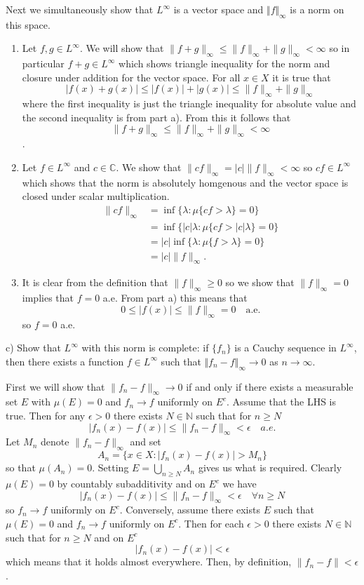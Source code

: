 \documentclass[12pt]{amsart} %
\def\N{\mathbb{N}}
\def\C{\mathbb{C}}
\begin{document}
Next we simultaneously show that $L^\infty$ is a vector space and $\Vert f \Vert_\infty$ is a norm on this space. 
\begin{enumerate}
	\item Let $f, g \in L^\infty$. We will show that $\|f + g\|_\infty \le  \|f\|_\infty + \|g\|_\infty < \infty $ so in particular $f+g \in L^\infty$ which shows triangle inequality for the norm and closure under addition for the vector space. For all $x \in X$ it is true that $$|f(x) + g(x)| \le  |f(x)| + |g(x)| \le \|f\|_\infty
		+ \|g\|_\infty$$ where the first inequality is just the triangle inequality for absolute value and the second inequality is from part a). From this it follows that $$\|f + g\|_\infty \le  \|f\|_\infty + \|g\|_\infty < \infty$$. 
	\item Let $f \in L^\infty$ and $c \in \C$. We show that $\|cf\|_\infty = |c| \|f\|_\infty < \infty$ so $cf \in L^\infty$ which shows that the norm is absolutely homgenous and the vector space is closed under scalar multiplication.
		\begin{align*}
			\|cf\|_\infty &= \inf\{\lambda: \mu\{cf > \lambda\} = 0 \} \\
				      &= \inf\{|c|\lambda: \mu\{cf > |c|\lambda\} = 0 \} \\
				      &= |c| \inf\{\lambda: \mu\{f > \lambda\} = 0 \} \\
				      &= |c| \|f\|_\infty.
		\end{align*}
		
	\item It is clear from the definition that $\|f\|_\infty \ge 0$ so we show that $\|f\|_\infty = 0$ implies that $f = 0$ a.e. From part a) this means that 
		$$0 \le  |f(x)| \le  \|f\|_\infty = 0 \quad \text{a.e.}$$ so $f = 0$ a.e. 
\end{enumerate}


\smallskip
c) Show that $L^\infty$ with this norm is complete: if $\{f_n\}$ is a Cauchy sequence in $L^\infty$, then there exists 
a function $f\in L^\infty$ such that $\Vert f_n-f\Vert_\infty\to 0$ as $n\to \infty$. 

First we will show that $\|f_n - f\|_\infty \to 0$ if and only if there exists a measurable set $E$ with $\mu(E) = 0$ and $f_n \to f$ uniformly on $E^c$. Assume that the LHS is true. 
Then for any  $\epsilon>0$ there exists $N \in \N$ such that for $n\ge N$ $$|f_n(x) - f(x)| \le \|f_n - f\|_\infty < \epsilon \quad a.e.$$ Let $M_n$ denote $\|f_n - f\|_\infty$ and set 
$$A_n = \{x \in X: |f_n(x) - f(x)| > M_n\}$$ so that $\mu(A_n) = 0$. Setting $E = \bigcup_{n \ge N} A_n$ gives us what is required. Clearly $\mu(E) = 0$ by countably subadditivity and on $E^c$ we have  $$|f_n(x) - f(x)| \le  \|f_n - f\|_\infty < \epsilon \quad \forall n \ge N$$ so $f_n \to f$ uniformly on $E^c$. 
Conversely, assume  there exists $E$ such that $\mu(E) = 0$ and $f_n \to  f$ uniformly on $E^c$. Then for each $\epsilon > 0$ there exists $N \in \N$ such that for $n \ge  N$ and on $E^c$ 
 $$|f_n(x) - f(x)| < \epsilon$$ which means that it holds almost everywhere. Then, by definition, $\|f_n - f\| < \epsilon$.
\end{document}
